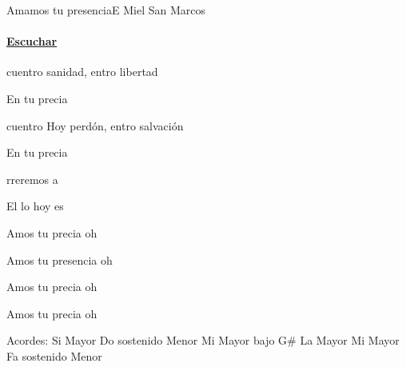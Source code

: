 \documentclass[12pt, spanish]{book}
\begin{document}
    \begin{song}{Amamos tu presencia}{E}
        {} %
        {Miel San Marcos}
        {} %
        {}
        \ifChordBk
            \paragraph{\mbox{}\hfill\protect\href{https://open.spotify.com/intl-es/track/0WQIkqhtJBYnHBE3xMg9M7}{Escuchar}\mbox{}\hfill}
        \fi


        \begin{SBOpGroup}
            cuentro sanidad,  entro libertad

            En tu precia

            cuentro Hoy perdón,  entro salvación

            En tu precia

            rreremos      a 

            El lo hoy es 
        \end{SBOpGroup}

        \begin{SBChorus}
            Amos tu precia oh 

            Amos tu presencia oh 

            Amos tu precia oh 

            Amos tu precia oh 
        \end{SBChorus}

        \ifChordBk
        \begin{SBOpGroup}
            Acordes:\break
            \upchord{\B}\qquad\qquad Si Mayor \hfill
            \upchord{\Csm}Do sostenido Menor \hfill\null\break
            \upchord{\EGs}\qquad Mi Mayor bajo G\# \hfill
            \upchord{\A}\qquad La Mayor \hfill\null\break
            \upchord{\E}\qquad Mi Mayor \hfill
            \upchord{\Fsm}\qquad Fa sostenido Menor \hfill\null\break
        \end{SBOpGroup}
        \fi
    \end{song}
\end{document}

